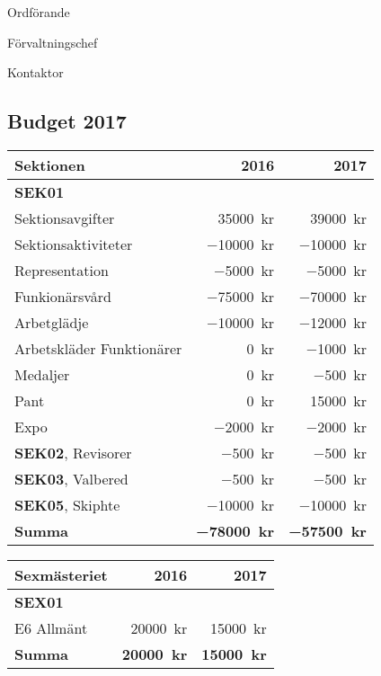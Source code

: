 \documentclass[../_main/handlingar.tex]{subfiles}
\begin{document}
\begin{signatures}{3}
    \ist
    \signature{\ordf}{Ordförande}
    \signature{Anders Nilsson}{Förvaltningschef}
    \signature{Johan Karlberg}{Kontaktor}
\end{signatures}

\newpage
\subsection*{Budget 2017}
\begin{tabularx}{10cm}{X r r}
    \textbf{\large Sektionen} & \textbf{2016} & \textbf{2017} \\
    \hline
    \textbf{SEK01} \\
    Sektionsavgifter & \SI{35000}{kr} & \SI{39000}{kr} \\
    Sektionsaktiviteter & \SI{-10000}{kr} & \SI{-10000}{kr} \\
    Representation & \SI{-5000}{kr} & \SI{-5000}{kr} \\
    Funkionärsvård & \SI{-75000}{kr} & \SI{-70000}{kr} \\
    Arbetglädje & \SI{-10000}{kr} & \SI{-12000}{kr} \\
    Arbetskläder Funktionärer & \SI{0}{kr} & \SI{-1000}{kr} \\
    Medaljer & \SI{0}{kr} & \SI{-500}{kr} \\
    Pant & \SI{0}{kr} & \SI{15000}{kr} \\
    Expo & \SI{-2000}{kr} & \SI{-2000}{kr} \\
    \textbf{SEK02}, Revisorer & \SI{-500}{kr} & \SI{-500}{kr} \\
    \textbf{SEK03}, Valbered & \SI{-500}{kr} & \SI{-500}{kr} \\
    \textbf{SEK05}, Skiphte & \SI{-10000}{kr} & \SI{-10000}{kr} \\
    \hline
    \textbf{Summa} & \textbf{\SI{-78000}{kr}} & \textbf{\SI{-57500}{kr}} \\
\end{tabularx}

\begin{tabularx}{10cm}{X r r}
    \textbf{\large Sexmästeriet} & \textbf{2016} & \textbf{2017} \\
    \hline
    \textbf{SEX01} \\
    E6 Allmänt & \SI{20000}{kr} & \SI{15000}{kr} \\
    \hline
    \textbf{Summa} & \textbf{\SI{20000}{kr}} & \textbf{\SI{15000}{kr}} \\
\end{tabularx}
\end{document}
